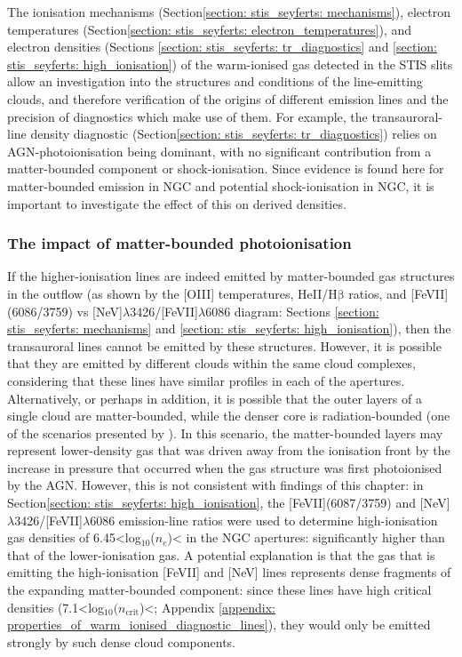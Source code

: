 The ionisation mechanisms (Section\;\ref{section: stis_seyferts: mechanisms}), electron temperatures (Section\;\ref{section: stis_seyferts: electron_temperatures}), and electron densities (Sections \ref{section: stis_seyferts: tr_diagnostics} and \ref{section: stis_seyferts: high_ionisation}) of the warm-ionised gas detected in the STIS slits allow an investigation into the structures and conditions of the line-emitting clouds, and therefore verification of the origins of different emission lines and the precision of diagnostics which make use of them. For example, the transauroral-line density diagnostic (Section\;\ref{section: stis_seyferts: tr_diagnostics}) relies on AGN-photoionisation being dominant, with no significant contribution from a matter-bounded component or shock-ionisation. Since evidence is found here for matter-bounded emission in NGC and potential shock-ionisation in NGC, it is important to investigate the effect of this on derived densities.

\subsubsection{The impact of matter-bounded photoionisation}
\label{section: stis_seyferts: disc-density-mb}

If the higher-ionisation lines are indeed emitted by matter-bounded gas structures in the outflow (as shown by the [OIII] temperatures, HeII/H$\mathrm{\beta}$ ratios, and [FeVII](6086/3759) vs [NeV]$\lambda$3426/[FeVII]$\lambda$6086 diagram: Sections \ref{section: stis_seyferts: mechanisms} and \ref{section: stis_seyferts: high_ionisation}), then the transauroral lines cannot be emitted by these structures. However, it is possible that they are emitted by different clouds within the same cloud complexes, considering that these lines have similar profiles in each of the apertures. Alternatively, or perhaps in addition, it is possible that the outer layers of a single cloud are matter-bounded, while the denser core is radiation-bounded (one of the scenarios presented by \citealt{Binette1996}). In this scenario, the matter-bounded layers may represent lower-density gas that was driven away from the ionisation front by the increase in pressure that occurred when the gas structure was first photoionised by the AGN. However, this is not consistent with findings of this chapter: in Section\;\ref{section: stis_seyferts: high_ionisation}, the [FeVII](6087/3759) and [NeV]$\lambda$3426/[FeVII]$\lambda$6086 emission-line ratios were used to determine high-ionisation gas densities of 6.45\;\textless\;log$_{10}$($n_e$\;[cm$^{-3}$])\;\textless{} in the NGC apertures: significantly higher than that of the lower-ionisation gas. A potential explanation is that the gas that is emitting the high-ionisation [FeVII] and [NeV] lines represents dense fragments of the expanding matter-bounded component: since these lines have high critical densities (7.1\;\textless\;log$_{10}(n_\mathrm{crit}$\;[cm$^{-3}$])\;\textless{}; Appendix \ref{appendix: properties_of_warm_ionised_diagnostic_lines}), they would only be emitted strongly by such dense cloud components.

